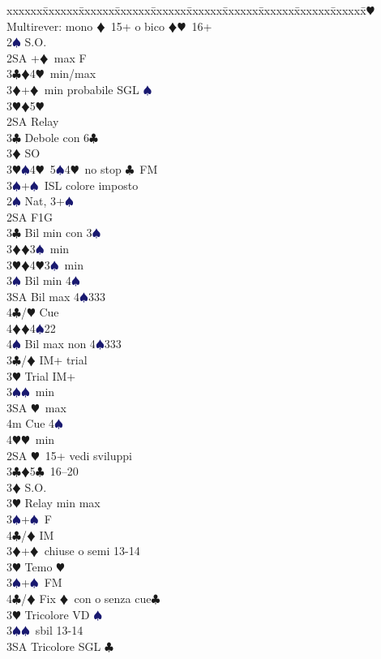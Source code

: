 \documentclass[a4paper,italian]{article}
\newcommand{\BC}{\textcolor{OliveGreen}{$\clubsuit$}}
\newcommand{\BD}{\textcolor{RedOrange}{$\vardiamondsuit$}}
\newcommand{\BH}{\textcolor{Red2}{$\varheartsuit${}}}
\newcommand{\BS}{\textcolor{MidnightBlue}{$\spadesuit${}}}
\newenvironment{bidtable}
{\begin{tabbing}

    xxxxxx\=xxxxxx\=xxxxxx\=xxxxxx\=xxxxxx\=xxxxxx\=xxxxxx\=xxxxxx\=xxxxxx\=xxxxxx\=\kill}
{\end{tabbing} }%
\begin{document}
\begin{multicols}{2}
\begin{bidtable}
        2\BH \> Multirever: mono \BD\ 15+ o bico \BD \BH\ 16+\+\\
        2\BS \> S.O.\+\\
        2SA +\BD\ max F\\
        3\BC {}\BD4\BH\ min/max\\
        3\BD {}+\BD\ min probabile SGL \BS \\
        3\BH {}\BD5\BH\-\\
        2SA \> Relay \\
        3\BC \> Debole con 6\BC \\
        3\BD \> SO\\
        3\BH {}\BS 4\BH\ 5\BS 4\BH\ no stop \BC\ FM\\
        3\BS {}+\BS\ ISL colore imposto\-\\
        2\BS \> Nat, 3+\BS \+\\
        2SA \> F1G\+\\
        3\BC \> Bil min con 3\BS \\
        3\BD {}\BD 3\BS\ min\\
        3\BH {}\BD 4\BH 3\BS\ min\\
        3\BS \> Bil min 4\BS \\
        3SA \> Bil max 4\BS 333\\
        4\BC/\BH \> Cue\\
        4\BD {}\BD 4\BS 22\\
        4\BS \> Bil max non 4\BS 333\-\\
        3\BC/\BD \> IM+ trial\\
        3\BH \> Trial IM+\+\\
        3\BS {}\BS\ min\\
        3SA \BH\ max\\
        4m \> Cue 4\BS \\
        4\BH {}\BH\ min\-\-\\
        2SA \BH\ 15+ vedi sviluppi\\
        3\BC {}\BD 5\BC\ 16--20\+\\
        3\BD \> S.O.\\
        3\BH \> Relay min max\\
        3\BS {}+\BS\ F\\
        4\BC/\BD \> IM\-\\
        3\BD {}+\BD\ chiuse o semi 13-14\+\\
        3\BH \> Temo \BH \\
        3\BS {}+\BS\ FM\\
        4\BC/\BD \> Fix \BD\ con o senza cue\BC \-\\
        3\BH \> Tricolore VD \BS \\
        3\BS {}\BS\ sbil 13-14\\
        3SA \> Tricolore SGL \BC \-
    \end{bidtable}


\end{multicols}
\end{document}
